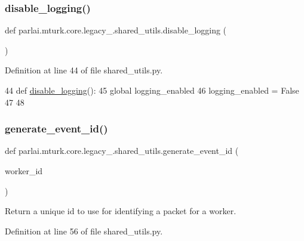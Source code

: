 \subsubsection{\texorpdfstring{disable\+\_\+logging()}{disable\_logging()}}
{\footnotesize\ttfamily def parlai.\+mturk.\+core.\+legacy\+\_.\+shared\+\_\+utils.\+disable\+\_\+logging (\begin{DoxyParamCaption}{ }\end{DoxyParamCaption})}



Definition at line 44 of file shared\+\_\+utils.\+py.


\begin{DoxyCode}
44 \textcolor{keyword}{def }\hyperlink{namespaceparlai_1_1mturk_1_1core_1_1shared__utils_ac9c2cb4e45eb5bb480df0cd8b18c64da}{disable\_logging}():
45     \textcolor{keyword}{global} logging\_enabled
46     logging\_enabled = \textcolor{keyword}{False}
47 
48 
\end{DoxyCode}
\mbox{\label{namespaceparlai_1_1mturk_1_1core_1_1legacy__2018_1_1shared__utils_afee39ef48ca5a78e840f508b25b57928}} 
\subsubsection{\texorpdfstring{generate\+\_\+event\+\_\+id()}{generate\_event\_id()}}
{\footnotesize\ttfamily def parlai.\+mturk.\+core.\+legacy\+\_.\+shared\+\_\+utils.\+generate\+\_\+event\+\_\+id (\begin{DoxyParamCaption}\item[{}]{worker\+\_\+id }\end{DoxyParamCaption})}

\begin{DoxyVerb}Return a unique id to use for identifying a packet for a worker.
\end{DoxyVerb}
 

Definition at line 56 of file shared\+\_\+utils.\+py.



